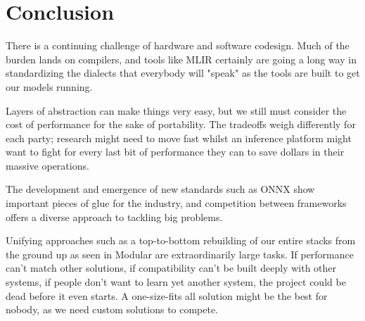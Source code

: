 \documentclass[manuscript,screen,review,format=acmsmall]{acmart}
\begin{document}
\section{Conclusion}

There is a continuing challenge of hardware and software codesign. Much of the burden lands on compilers, and tools like MLIR certainly are going a long way in standardizing the dialects that everybody will "speak" as the tools are built to get our models running.

Layers of abstraction can make things very easy, but we still must consider the cost of performance for the sake of portability. The tradeoffs weigh differently for each party; research might need to move fast whilst an inference platform might want to fight for every last bit of performance they can to save dollars in their massive operations.

The development and emergence of new standards such as ONNX show important pieces of glue for the industry, and competition between frameworks offers a diverse approach to tackling big problems.

Unifying approaches such as a top-to-bottom rebuilding of our entire stacks from the ground up as seen in Modular are extraordinarily large tasks. If performance can't match other solutions, if compatibility can't be built deeply with other systems, if people don't want to learn yet another system, the project could be dead before it even starts. A one-size-fits all solution might be the best for nobody, as we need custom solutions to compete.


 


\end{document}
